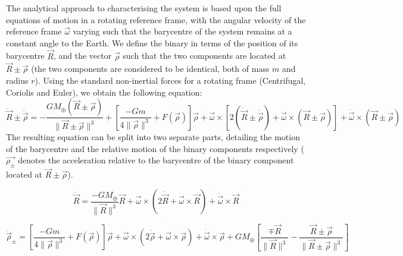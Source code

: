 \documentclass[letterpaper, preprint, paper,11pt]{AAS}	%
\begin{document}
The analytical approach to characterising the system is based upon the full equations of motion in a rotating reference frame, with the angular velocity of the reference frame $\vec{\omega}$ varying such that the barycentre of the system remains at a constant angle to the Earth. We define the binary in terms of the position of its barycentre $\vec{R}$, and the vector $\vec{\rho}$ such that the two components are located at $\vec{R}\pm\vec{\rho}$ (the two components are considered to be identical, both of mass $m$ and radius $r$). Using the standard non-inertial forces for a rotating frame (Centrifugal, Coriolis and Euler), we obtain the following equation:
\begin{equation}
\ddot{\vec{R}}\pm\ddot{\vec{\rho}} = -\frac{GM_\oplus(\vec{R}\pm\vec{\rho})}{\|\vec{R}\pm\vec{\rho}\|^{3}} + \left[\frac{-Gm}{4\|\vec{\rho}\|^{3}}+F(\vec{\rho})\right]\vec{\rho} +  \vec{\omega}\times[2(\dot{\vec{R}}\pm\dot{\vec{\rho}}) + \vec{\omega}\times(\vec{R}\pm\vec{\rho})]+\dot{\vec{\omega}}\times(\vec{R}\pm\vec{\rho}) 
\end{equation}
The resulting equation can be split into two separate parts, detailing the motion of the barycentre and the relative motion of the binary components respectively ($\vec{\rho_{\pm}}$ denotes the acceleration relative to the barycentre of the binary component located at $\vec{R}\pm\vec{\rho}$).
 
\begin{equation}
\ddot{\vec{R}} = \frac{-GM_\oplus}{\|\vec{R}\|^{3}}\vec{R}+\vec{\omega}\times(2\dot{\vec{R}}+\vec{\omega}\times\vec{R})+\dot{\vec{\omega}}\times\vec{R}
\end{equation}

\begin{equation}
\ddot{\vec{\rho}}_{\pm} = \left[\frac{-Gm}{4\|\vec{\rho}\|^{3}}+F(\vec{\rho})\right]\vec{\rho}+\vec{\omega}\times(2\dot{\vec{\rho}}+\vec{\omega}\times\vec{\rho})+\dot{\vec{\omega}}\times\vec{\rho}+{GM_\oplus}\left[\frac{\mp\vec{R}}{\|\vec{R}\|^{3}}-\frac{\vec{R}\pm\vec{\rho}}{\|\vec{R}\pm\vec{\rho}\|^{3}}\right]
\end{equation}
\end{document}
